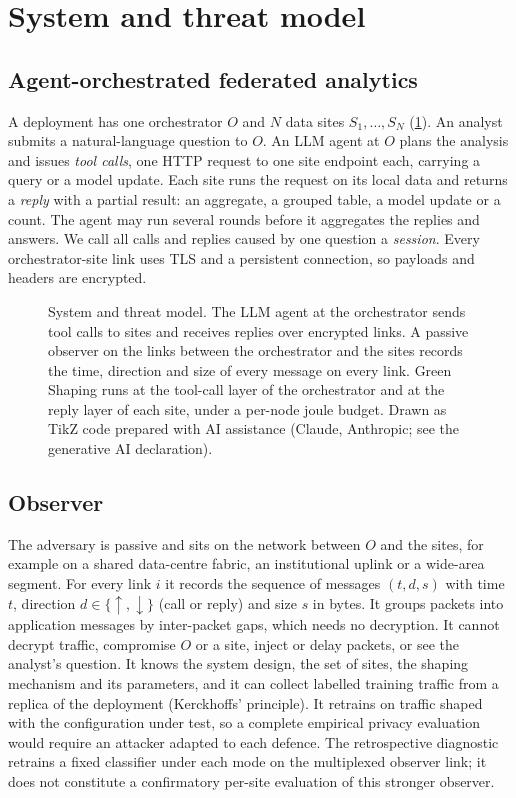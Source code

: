 \section{System and threat model}\label{sec:model}

\subsection{Agent-orchestrated federated analytics}
A deployment has one orchestrator $O$ and $N$ data sites $S_1,\dots,S_N$ (\cref{fig:arch}). An analyst submits a natural-language question to $O$. An LLM agent at $O$ plans the analysis and issues \emph{tool calls}, one HTTP request to one site endpoint each, carrying a query or a model update. Each site runs the request on its local data and returns a \emph{reply} with a partial result: an aggregate, a grouped table, a model update or a count. The agent may run several rounds before it aggregates the replies and answers. We call all calls and replies caused by one question a \emph{session}. Every orchestrator-site link uses TLS and a persistent connection, so payloads and headers are encrypted.

\begin{figure}[t]
\centering

\caption{System and threat model. The LLM agent at the orchestrator sends tool calls to sites and receives replies over encrypted links. A passive observer on the links between the orchestrator and the sites records the time, direction and size of every message on every link. Green Shaping runs at the tool-call layer of the orchestrator and at the reply layer of each site, under a per-node joule budget. Drawn as TikZ code prepared with AI assistance (Claude, Anthropic; see the generative AI declaration).}
\label{fig:arch}
\end{figure}

\subsection{Observer}
The adversary is passive and sits on the network between $O$ and the sites, for example on a shared data-centre fabric, an institutional uplink or a wide-area segment. For every link $i$ it records the sequence of messages $(t,d,s)$ with time $t$, direction $d\in\{\uparrow,\downarrow\}$ (call or reply) and size $s$ in bytes. It groups packets into application messages by inter-packet gaps, which needs no decryption. It cannot decrypt traffic, compromise $O$ or a site, inject or delay packets, or see the analyst's question. It knows the system design, the set of sites, the shaping mechanism and its parameters, and it can collect labelled training traffic from a replica of the deployment (Kerckhoffs' principle). It retrains on traffic shaped with the configuration under test, so a complete empirical privacy evaluation would require an attacker adapted to each defence. The retrospective diagnostic retrains a fixed classifier under each mode on the multiplexed observer link; it does not constitute a confirmatory per-site evaluation of this stronger observer.

